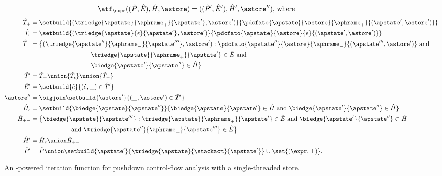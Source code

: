 \begin{figure}
\figrule
\begin{align*}
  \atf_\expr((\hat P,\hat E), \hat H, \astore) &= ((\hat P',\hat E'), \hat H', \astore'')
  \text{, where }
\end{align*}
\begin{align*}
  \hat T_+ &= \setbuild{ (\triedge{\apstate}{\aphrame_+}{\apstate'},\astore') }{
    \pdcfato{\apstate}{\astore}{\aphrame_+}{(\apstate',\astore')}
  }
  \\
  \hat T_\epsilon &= \setbuild{ (\triedge{\apstate}{\epsilon}{\apstate'},\astore') }{
    \pdcfato{\apstate}{\astore}{\epsilon}{(\apstate',\astore')} }
  \\
 \hat T_- &= 
  \big\{
    (\triedge{\apstate''}{\aphrame_-}{\apstate'''},\astore') 
  :
    \pdcfato{\apstate''}{\astore}{\aphrame_-}{(\apstate''',\astore')} \text{ and }  
    \\
    &\hspace{9.5em}
    \triedge{\apstate}{\aphrame_+}{\apstate'} \in \hat E \text{ and }
    \\
    &\hspace{9.5em}
    \biedge{\apstate'}{\apstate''} \in \hat H
    \big\}
  \\
  \hat T' &= {\hat T_+} \union {\hat T_\epsilon} \union {\hat T_-}
  \\
  \hat E' &= \setbuild{ \hat e }{ (\hat e,\_) \in \hat T '}
  \\
  \astore'' &= \bigjoin \setbuild{ \astore' }{ (\_, \astore') \in \hat T'}
  \\
  \hat H_{\epsilon} &= \setbuild{ \biedge{\apstate}{\apstate''} }{
    \biedge{\apstate}{\apstate'} \in \hat H \text{ and } 
      \biedge{\apstate'}{\apstate''} \in \hat H
  }
  \\
  \hat H_{{+}{-}} &= \big\{
  \biedge{\apstate}{\apstate'''}
    : 
    \triedge{\apstate}{\aphrame_+}{\apstate'} \in \hat E
    \text{ and }
    \biedge{\apstate'}{\apstate''} \in \hat H 
    \\
    & \hspace{6.1em} \text{ and } 
    \triedge{\apstate''}{\aphrame_-}{\apstate'''} \in \hat E
    \big\}
  \\
  \hat H' &=   \hat H_{\epsilon} \union   \hat H_{{+}{-}} 
  \\
  \hat P' &= \hat P \union \setbuild{ \apstate' }{ \triedge{\apstate}{\stackact}{\apstate'} } \cup \set{(\expr,\bot)}  
  \text.
\end{align*}
\caption{An \ecg{}-powered iteration function for pushdown control-flow analysis with a single-threaded store.}
\label{fig:widen-trans}
\figrule
\end{figure}

